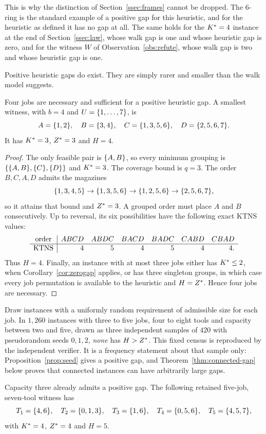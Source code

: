 This is why the distinction of Section~\ref{ssec:frames} cannot be dropped. The
$6$-ring is the standard example of a positive gap for this heuristic, and for the
heuristic as defined it has no gap at all. The same holds for the $K^{\ast}=4$ instance
at the end of Section~\ref{ssec:law}, whose walk gap is one and whose heuristic gap
  is zero, and for the witness $W$ of Observation~\ref{obs:refute}, whose walk gap is
two and whose heuristic gap is one.

Positive heuristic gaps do exist. They are simply rarer and smaller than the walk
model suggests.

\begin{proposition}\label{prop:seed}
Four jobs are necessary and sufficient for a positive heuristic gap. A smallest
witness, with $b=4$ and $U=\{1,\dots,7\}$, is
\[
  A=\{1,2\},\quad B=\{3,4\},\quad
  C=\{1,3,5,6\},\quad D=\{2,5,6,7\}.
\]
It has $K^{\ast}=3$, $Z^{\ast}=3$ and $H=4$.
\end{proposition}

\begin{proof}
The only feasible pair is $\{A,B\}$, so every minimum grouping is
$\{\{A,B\},\{C\},\{D\}\}$ and $K^{\ast}=3$. The coverage bound is $q=3$.
The order $B,C,A,D$ admits the magazines
\[
 \{1,3,4,5\}\to\{1,3,5,6\}\to
 \{1,2,5,6\}\to\{2,5,6,7\},
\]
so it attains that bound and $Z^{\ast}=3$. A grouped order must place $A$ and $B$
consecutively. Up to reversal, its six possibilities have the following exact
KTNS values:
\[
\begin{array}{c|rrrrrr}
\text{order}&ABCD&ABDC&BACD&BADC&CABD&CBAD\\\hline
\operatorname{KTNS}&4&5&4&5&4&4 .
\end{array}
\]
Thus $H=4$. Finally, an instance with at most three jobs either has
$K^{\ast}\le2$, when Corollary~\ref{cor:zerogap} applies, or has three singleton
groups, in which case every job permutation is available to the heuristic and
$H=Z^{\ast}$. Hence four jobs are necessary.
\end{proof}

\begin{observation}\label{obs:census}
Draw instances with a uniformly random requirement of admissible size for each job. In
$1{,}260$ instances with three to five jobs, four to eight tools and capacity between
two and five, drawn as three independent samples of $420$ with pseudorandom seeds
$0,1,2$, \emph{none} has $H>Z^{\ast}$.
This fixed census is reproduced by the independent verifier. It is a frequency
statement about that sample only: Proposition~\ref{prop:seed} gives a positive gap,
and Theorem~\ref{thm:connected-gap} below proves that connected instances can have
arbitrarily large gaps.

Capacity three already admits a positive gap. The following retained five-job,
seven-tool witness has
\[
  T_1=\{4,6\},\quad T_2=\{0,1,3\},\quad T_3=\{1,6\},\quad
  T_4=\{0,5,6\},\quad T_5=\{4,5,7\},
\]
with $K^{\ast}=4$, $Z^{\ast}=4$ and $H=5$.
\end{observation}

